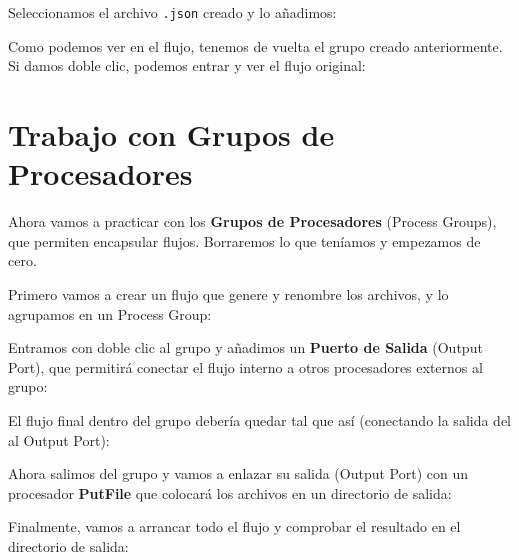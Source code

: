 \documentclass{../../../miPlantilla}
\begin{document}
\newpage

Seleccionamos el archivo \texttt{.json} creado y lo añadimos:


Como podemos ver en el flujo, tenemos de vuelta el grupo creado anteriormente. Si damos doble clic, podemos entrar y ver el flujo original:


\newpage

\section{Trabajo con Grupos de Procesadores}
Ahora vamos a practicar con los \textbf{Grupos de Procesadores} (Process Groups), que permiten encapsular flujos. Borraremos lo que teníamos y empezamos de cero.

Primero vamos a crear un flujo que genere y renombre los archivos, y lo agrupamos en un Process Group:


Entramos con doble clic al grupo y añadimos un \textbf{Puerto de Salida} (Output Port), que permitirá conectar el flujo interno a otros procesadores externos al grupo:

\begin{figure}[H]
    \centering
    \begin{minipage}{0.1\textwidth}
    \end{minipage}\hfill
    \begin{minipage}{0.8\textwidth}
    \end{minipage}
\end{figure}

\newpage

El flujo final dentro del grupo debería quedar tal que así (conectando la salida del  al Output Port):


Ahora salimos del grupo y vamos a enlazar su salida (Output Port) con un procesador \textbf{PutFile} que colocará los archivos en un directorio de salida:


\newpage

Finalmente, vamos a arrancar todo el flujo y comprobar el resultado en el directorio de salida:

\end{document}
